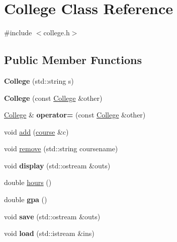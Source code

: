 \hypertarget{class_college}{}\section{College Class Reference}
\label{class_college}


{\ttfamily \#include $<$college.\+h$>$}

\subsection*{Public Member Functions}
\begin{DoxyCompactItemize}
\item 
\mbox{\label{class_college_adabaf4087355e83f9f7d39f1e1498b41}} 
{\bfseries College} (std\+::string s)
\item 
\mbox{\label{class_college_ad007ad488e5a7ef986114080d0c8e101}} 
{\bfseries College} (const \mbox{\hyperlink{class_college}{College}} \&other)
\item 
\mbox{\label{class_college_af2194c9b37f80d13dc3fdba6784b18e8}} 
\mbox{\hyperlink{class_college}{College}} \& {\bfseries operator=} (const \mbox{\hyperlink{class_college}{College}} \&other)
\item 
void \mbox{\hyperlink{class_college_a67fd1d8970b46b24ce2e0dd72598a22f}{add}} (\mbox{\hyperlink{classcourse}{course}} \&c)
\item 
void \mbox{\hyperlink{class_college_a4d2ae513b36e6421fb1ca2c08459cfe6}{remove}} (std\+::string coursename)
\item 
\mbox{\label{class_college_a52ca0a164483cf5c05591cd0fb8b300c}} 
void {\bfseries display} (std\+::ostream \&outs)
\item 
double \mbox{\hyperlink{class_college_a8a7a762611a1d7e00c453390d49355fd}{hours}} ()
\item 
\mbox{\label{class_college_aaf9bfaa0bc717e96da6365661a96fcd0}} 
double {\bfseries gpa} ()
\item 
\mbox{\label{class_college_af6b419f813bc990c0e11f99b78a26899}} 
void {\bfseries save} (std\+::ostream \&outs)
\item 
\mbox{\label{class_college_a11422094ddd907705daede7aa537dd73}} 
void {\bfseries load} (std\+::istream \&ins)
\end{DoxyCompactItemize}


